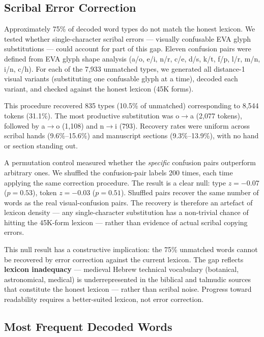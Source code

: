 \documentclass[11pt,a4paper]{article}
\begin{document}
\subsection{Scribal Error Correction}
\label{sec:scribal-errors}

Approximately 75\% of decoded word types do not match the honest lexicon.
We tested whether single-character scribal errors --- visually confusable
EVA glyph substitutions --- could account for part of this gap.  Eleven
confusion pairs were defined from EVA glyph shape analysis (a/o, e/i, n/r,
c/e, d/s, k/t, f/p, l/r, m/n, i/n, c/h).  For each of the 7{,}933
unmatched types, we generated all distance-1 visual variants (substituting
one confusable glyph at a time), decoded each variant, and checked against
the honest lexicon (45K forms).

This procedure recovered 835 types (10.5\% of unmatched) corresponding to
8{,}544 tokens (31.1\%).  The most productive substitution was o$\to$a
(2{,}077 tokens), followed by a$\to$o (1{,}108) and n$\to$i (793).
Recovery rates were uniform across scribal hands (9.6\%--15.6\%) and
manuscript sections (9.3\%--13.9\%), with no hand or section standing out.

A permutation control measured whether the \emph{specific} confusion pairs
outperform arbitrary ones.  We shuffled the confusion-pair labels 200 times,
each time applying the same correction procedure.  The result is a clear
null: type $z=-0.07$ ($p=0.53$), token $z=-0.03$ ($p=0.51$).  Shuffled
pairs recover the same number of words as the real visual-confusion pairs.
The recovery is therefore an artefact of lexicon density --- any
single-character substitution has a non-trivial chance of hitting the
45K-form lexicon --- rather than evidence of actual scribal copying errors.

This null result has a constructive implication: the 75\% unmatched words
cannot be recovered by error correction against the current lexicon.  The
gap reflects \textbf{lexicon inadequacy} --- medieval Hebrew technical
vocabulary (botanical, astronomical, medical) is underrepresented in the
biblical and talmudic sources that constitute the honest lexicon --- rather
than scribal noise.  Progress toward readability requires a better-suited
lexicon, not error correction.

\subsection{Most Frequent Decoded Words}
\label{sec:words}
\end{document}
